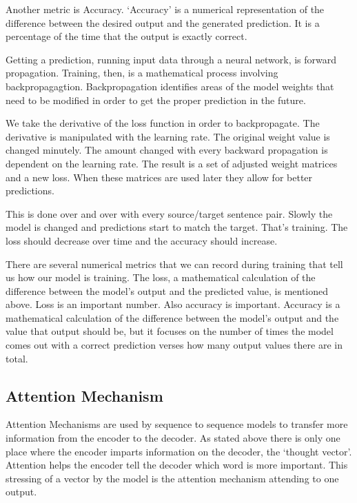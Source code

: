 Another metric is Accuracy. `Accuracy' is a numerical representation of the difference between the desired output and the generated prediction. It is a percentage of the time that the output is exactly correct.

Getting a prediction, running input data through a neural network, is forward propagation. Training, then, is a mathematical process involving backpropagagtion. Backpropagation identifies areas of the model weights that need to be modified in order to get the proper prediction in the future.

We take the derivative of the loss function in order to backpropagate. The derivative is manipulated with the learning rate. The original weight value is changed minutely. The amount changed with every backward propagation is dependent on the learning rate. The result is a set of adjusted weight matrices and a new loss. When these matrices are used later they allow for better predictions. 

This is done over and over with every source/target sentence pair. Slowly the model is changed and predictions start to match the target. That's training. The loss should decrease over time and the accuracy should increase.

There are several numerical metrics that we can record during training that tell us how our model is training. The loss, a mathematical calculation of the difference between the model's output and the predicted value, is mentioned above. Loss is an important number. Also accuracy is important. Accuracy is a mathematical calculation of the difference between the model's output and the value that output should be, but it focuses on the number of times the model comes out with a correct prediction verses how many output values there are in total.

\subsection{Attention Mechanism}

\label{section-gru-attention}

Attention Mechanisms are used by sequence to sequence models to transfer more information from the encoder to the decoder. As stated above there is only one place where the encoder imparts information on the decoder, the `thought vector'. Attention helps the encoder tell the decoder which word is more important. This stressing of a vector by the model is the attention mechanism attending to one output.

